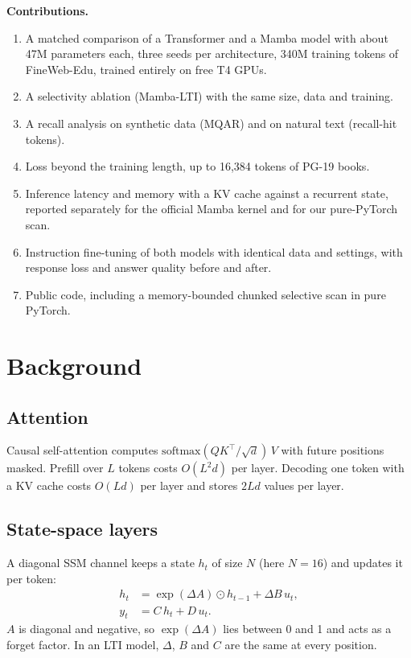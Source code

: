 \documentclass[conference]{IEEEtran}
\begin{document}
\textbf{Contributions.}
\begin{enumerate}
  \item A matched comparison of a Transformer and a Mamba model with about 47M parameters each, three
        seeds per architecture, 340M training tokens of FineWeb-Edu, trained entirely on free T4 GPUs.
  \item A selectivity ablation (Mamba-LTI) with the same size, data and training.
  \item A recall analysis on synthetic data (MQAR) and on natural text (recall-hit tokens).
  \item Loss beyond the training length, up to 16,384 tokens of PG-19 books.
  \item Inference latency and memory with a KV cache against a recurrent state, reported separately for
        the official Mamba kernel and for our pure-PyTorch scan.
  \item Instruction fine-tuning of both models with identical data and settings, with response loss and
        answer quality before and after.
  \item Public code, including a memory-bounded chunked selective scan in pure PyTorch.
\end{enumerate}

\section{Background}

\subsection{Attention}
Causal self-attention computes $\mathrm{softmax}(QK^\top/\sqrt{d})\,V$ with future positions masked.
Prefill over $L$ tokens costs $O(L^2 d)$ per layer. Decoding one token with a KV cache costs $O(Ld)$
per layer and stores $2Ld$ values per layer.

\subsection{State-space layers}
A diagonal SSM channel keeps a state $h_t$ of size $N$ (here $N = 16$) and updates it per token:
\begin{align}
  h_t &= \exp(\Delta A) \odot h_{t-1} + \Delta B\, u_t, \label{eq:ssm}\\
  y_t &= C\, h_t + D\, u_t .
\end{align}
$A$ is diagonal and negative, so $\exp(\Delta A)$ lies between 0 and 1 and acts as a forget factor. In
an LTI model, $\Delta$, $B$ and $C$ are the same at every position.
\end{document}
